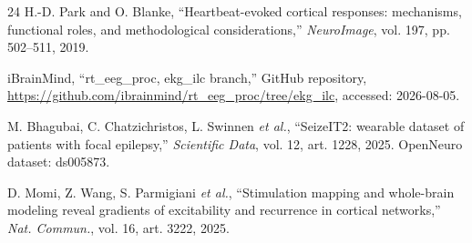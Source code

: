 \documentclass[conference]{IEEEtran}
\begin{document}
\begin{thebibliography}{24}
 H.-D. Park and O. Blanke, ``Heartbeat-evoked cortical responses: mechanisms,
functional roles, and methodological considerations,'' \emph{NeuroImage}, vol. 197, pp. 502--511,
2019.

 iBrainMind, ``rt\_eeg\_proc, ekg\_ilc branch,'' GitHub repository,
\url{https://github.com/ibrainmind/rt_eeg_proc/tree/ekg_ilc}, accessed: 2026-08-05.

 M. Bhagubai, C. Chatzichristos, L. Swinnen \emph{et al.}, ``SeizeIT2: wearable
dataset of patients with focal epilepsy,'' \emph{Scientific Data}, vol. 12, art. 1228, 2025.
OpenNeuro dataset: ds005873.

 D. Momi, Z. Wang, S. Parmigiani \emph{et al.}, ``Stimulation mapping and
whole-brain modeling reveal gradients of excitability and recurrence in cortical networks,''
\emph{Nat. Commun.}, vol. 16, art. 3222, 2025.

\end{thebibliography}
\end{document}
